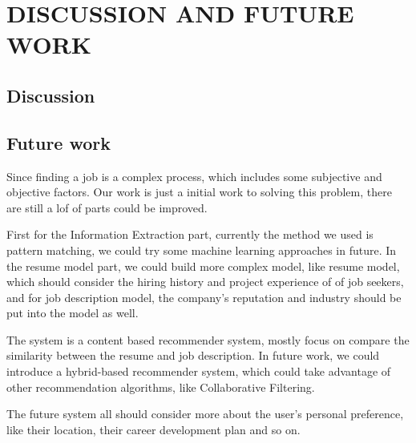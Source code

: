 \chapter{DISCUSSION AND FUTURE WORK}

\section{Discussion}



\section{Future work}

Since finding a job is a complex process, which includes some subjective and objective factors.  Our work is just a initial work to solving  this problem, there are still a lof of parts could be improved. 

First for the Information Extraction part, currently the method we used is pattern matching, we could try some machine learning approaches in future. In the resume model part, we could build more complex model, like resume model, which should consider the hiring history and project experience of of job seekers, and for job description model, the company's reputation and industry should be put into the model as well. 

The system is a content based recommender system, mostly focus on compare the similarity between the resume and job description. In future work, we could introduce a hybrid-based recommender system, which could take advantage of other recommendation algorithms, like Collaborative Filtering. 

The future system all should consider more about the user's personal preference, like their location, their career development plan and so on.       